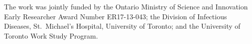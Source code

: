 The work was jointly funded by the Ontario Ministry of Science and Innovation Early Researcher Award Number ER17-13-043; the Division of Infectious Diseases, St.\ Michael's Hospital, University of Toronto; and the University of Toronto Work Study Program.
